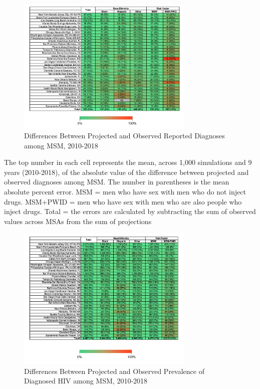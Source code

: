 \documentclass{article}
\begin{document}
\begin{figure}[H]
	\centering
	\caption{Differences Between Projected and Observed Reported Diagnoses among MSM, 2010-2018}
	\includegraphics[width=0.75\textwidth]{images/FigureS2_Table}
\end{figure}


The top number in each cell represents the mean, across 1,000 simulations and 9 years (2010-2018), of the absolute value of the difference between projected and observed diagnoses among MSM. The number in parentheses is the mean absolute percent error. \dag MSM = men who have sex with men who do not inject drugs. MSM+PWID = men who have sex with men who are also people who inject drugs. Total = the errors are calculated by subtracting the sum of observed values across MSAs from the sum of projections

\begin{figure}[H]
	\centering
	\caption{Differences Between Projected and Observed Prevalence of Diagnosed HIV among MSM, 2010-2018}
	\includegraphics[width=0.75\textwidth]{images/FigureS3_Table}
\end{figure}
\end{document}

